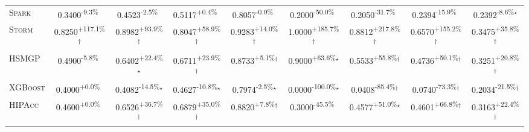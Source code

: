 \begin{table}[htbp]
\begin{tabular}{l|cccc|cccc}
\textsc{Spark} & \cellcolor{red!30}0.3400\textsuperscript{-9.3\%}$^{\,\,\,}$ & \cellcolor{red!30}0.4523\textsuperscript{-2.5\%}$^{\,\,\,}$ & \cellcolor{green!30}0.5117\textsuperscript{+0.4\%}$^{\,\,\,}$ & \cellcolor{red!30}0.8057\textsuperscript{-0.9\%}$^{\,\,\,}$ & \cellcolor{red!30}0.2000\textsuperscript{-50.0\%}$^{\,\,\,}$ & \cellcolor{red!30}0.2050\textsuperscript{-31.7\%}$^{\,\,\,}$ & \cellcolor{red!30}0.2394\textsuperscript{-15.9\%}$^{\,\,\,}$ & \cellcolor{red!30}0.2392\textsuperscript{-8.6\%}$^\star$ \\
\textsc{Storm} & \cellcolor{green!30}0.8250\textsuperscript{+117.1\%}$^\dagger$ & \cellcolor{green!30}0.8982\textsuperscript{+93.9\%}$^\dagger$ & \cellcolor{green!30}0.8047\textsuperscript{+58.9\%}$^\dagger$ & \cellcolor{green!30}0.9283\textsuperscript{+14.0\%}$^\dagger$ & \cellcolor{green!30}1.0000\textsuperscript{+185.7\%}$^\dagger$ & \cellcolor{green!30}0.8812\textsuperscript{+217.8\%}$^\dagger$ & \cellcolor{green!30}0.6570\textsuperscript{+155.2\%}$^\dagger$ & \cellcolor{green!30}0.3475\textsuperscript{+35.8\%}$^\dagger$ \\
\textsc{HSMGP} & \cellcolor{red!30}0.4900\textsuperscript{-5.8\%}$^{\,\,\,}$ & \cellcolor{green!30}0.6402\textsuperscript{+22.4\%}$^\star$ & \cellcolor{green!30}0.6711\textsuperscript{+23.9\%}$^\dagger$ & \cellcolor{green!30}0.8733\textsuperscript{+5.1\%}$^\dagger$ & \cellcolor{green!30}0.9000\textsuperscript{+63.6\%}$^\star$ & \cellcolor{green!30}0.5533\textsuperscript{+55.8\%}$^\dagger$ & \cellcolor{green!30}0.4736\textsuperscript{+50.1\%}$^\dagger$ & \cellcolor{green!30}0.3251\textsuperscript{+20.8\%}$^\dagger$ \\
\textsc{XGBoost} & \cellcolor{green!30}0.4000\textsuperscript{+0.0\%}$^{\,\,\,}$ & \cellcolor{red!30}0.4082\textsuperscript{-14.5\%}$^\star$ & \cellcolor{red!30}0.4627\textsuperscript{-10.8\%}$^\star$ & \cellcolor{red!30}0.7974\textsuperscript{-2.5\%}$^\star$ & \cellcolor{red!30}0.0000\textsuperscript{-100.0\%}$^\star$ & \cellcolor{red!30}0.0408\textsuperscript{-85.4\%}$^\dagger$ & \cellcolor{red!30}0.0740\textsuperscript{-73.3\%}$^\dagger$ & \cellcolor{red!30}0.2034\textsuperscript{-21.5\%}$^\dagger$ \\
\textsc{HIPAcc} & \cellcolor{green!30}0.4600\textsuperscript{+0.0\%}$^{\,\,\,}$ & \cellcolor{green!30}0.6526\textsuperscript{+36.7\%}$^\dagger$ & \cellcolor{green!30}0.6879\textsuperscript{+35.0\%}$^\dagger$ & \cellcolor{green!30}0.8820\textsuperscript{+7.8\%}$^\dagger$ & \cellcolor{red!30}0.3000\textsuperscript{-45.5\%}$^{\,\,\,}$ & \cellcolor{green!30}0.4577\textsuperscript{+51.0\%}$^\star$ & \cellcolor{green!30}0.4601\textsuperscript{+66.8\%}$^\dagger$ & \cellcolor{green!30}0.3163\textsuperscript{+22.4\%}$^\dagger$ \\

\end{tabular}
\end{table}
